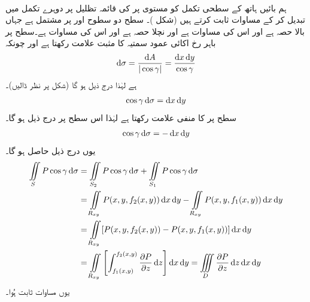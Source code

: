 \\
ہم بائیں ہاتھ کے سطحی تکمل کو مستوی  پر  کی قائمہ   تظلیل    پر دوہرے تکمل میں تبدیل کر کے مساوات  ثابت  کرتے ہیں (شکل )۔ سطح    دو سطوح   اور  پر مشتمل ہے جہاں  بالا حصہ ہے اور اس کی مساوات  ہے اور   نچلا حصہ  ہے اور اس کی مساوات  ہے۔سطح  پر باہر رخ اکائی عمود سمتیہ   کا     مثبت علامت رکھتا ہے اور  چونکہ 
\begin{align*}
\dif\sigma=\frac{\dif A}{|\cos\gamma|}=\frac{\dif x\dif y}{\cos\gamma}
\end{align*}
ہے لہٰذا درج ذیل ہو گا (شکل    پر نظر ڈالیں)۔
\begin{align*}
\cos\gamma\dif\sigma=\dif x\dif y
\end{align*}
سطح  پر  کا     منفی علامت رکھتا ہے لہٰذا  اس سطح پر درج ذیل ہو گا۔
\begin{align*}
\cos\gamma\dif\sigma=-\dif x\dif y
\end{align*}
یوں درج ذیل حاصل ہو گا۔
\begin{align*}
\iint\limits_S P\cos\gamma\dif\sigma&=\iint\limits_{S_2}P\cos\gamma\dif\sigma+\iint\limits_{S_1}P\cos\gamma\dif\sigma\\
&=\iint\limits_{R_{xy}} P(x,y,f_2(x,y))\dif x\dif y-\iint\limits_{R_{xy}}P(x,y,f_1(x,y))\dif x\dif y\\
&=\iint\limits_{R_{xy}}[P(x,y,f_2(x,y))-P(x,y,f_1(x,y))]\dif  x\dif y\\
&=\iint\limits_{R_{xy}}\left[\int_{f_1(x,y)}^{f_2(x,y)}\frac{\partial P}{\partial z}\dif z\right]\dif x\dif y=\iiint\limits_D\frac{\partial P}{\partial z}\dif z\dif x\dif y
\end{align*}
یوں مساوات  ثابت ہُوا۔
